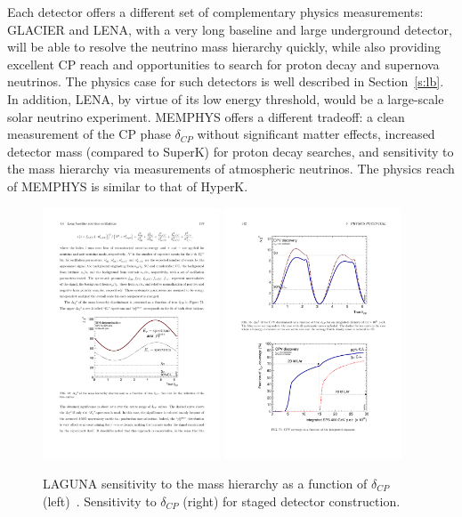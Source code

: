 Each detector offers a different set of
complementary physics measurements: GLACIER and LENA, with a very long
baseline and large underground detector, will be able to resolve the
neutrino mass hierarchy quickly, while also providing excellent CP
reach and opportunities to search for proton decay and supernova
neutrinos. The physics case for such detectors is well described in
Section~\ref{s:lb}. In addition, LENA, by virtue of its low energy
threshold, would be a large-scale solar neutrino experiment. MEMPHYS offers a different tradeoff: a clean
measurement of the CP phase $\delta_{CP}$ without significant matter
effects, increased detector mass (compared to SuperK) for proton decay
searches, and sensitivity to the mass hierarchy via measurements
of atmospheric neutrinos. The physics reach of MEMPHYS is similar to that of
HyperK. 

\begin{figure}[b]
\vspace{-0.1cm}
\begin{center}
\includegraphics[width=0.47\textwidth]{YGK/LAGUNA_MH.pdf}
\includegraphics[width=0.47\textwidth]{YGK/LAGUNA_CP.pdf}
\caption{LAGUNA sensitivity to the mass hierarchy as a function of
  $\delta_{CP}$
  (left)~\cite{nonus:LBNO_LOI}. Sensitivity to
  $\delta_{CP}$ (right) for staged detector construction. } 
\label{fig:LAGUNA_sens}
\vspace{-0.35cm}
\end{center}\end{figure}

